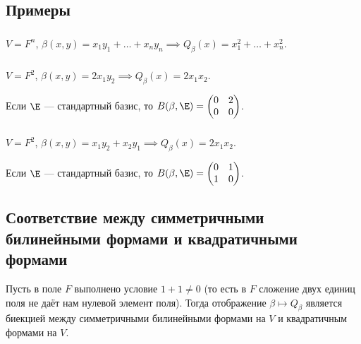 \subsection{Примеры}

\subsubsection{}

$V = F^n$, $\beta(x, y) = x_1 y_1 + \dots + x_n y_n \implies Q_\beta(x) = x_1^2 + \dots + x_n^2$.

\subsubsection{}

$V = F^2$, $\beta(x, y) = 2x_1 y_2 \implies Q_\beta(x) = 2x_1 x_2$.

Если $\E$ --- стандартный базис, то $B(\beta, \E) = \begin{pmatrix} 0 & 2 \\ 0 & 0 \end{pmatrix}$.

\subsubsection{}

$V = F^2$, $\beta(x, y) = x_1 y_2 + x_2 y_1 \implies Q_\beta(x) = 2x_1 x_2$.

Если $\E$ --- стандартный базис, то $B(\beta, \E) = \begin{pmatrix} 0 & 1 \\ 1 & 0 \end{pmatrix}$.


\subsection{Соответствие между симметричными билинейными формами и квадратичными формами}

\begin{proposal}
    Пусть в поле $F$ выполнено условие $1 + 1 \neq 0$ (то есть в $F$ сложение двух единиц поля не даёт нам нулевой элемент поля). Тогда отображение $\beta \mapsto Q_\beta$ является биекцией между симметричными билинейными формами на $V$ и квадратичным формами на $V$.
\end{proposal}


